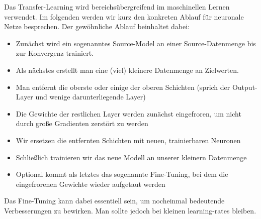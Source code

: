 Das Transfer-Learning wird bereichsübergreifend im maschinellen Lernen verwendet. Im folgenden werden wir kurz den konkreten Ablauf für neuronale Netze besprechen. Der gewöhnliche Ablauf beinhaltet dabei:
\begin{itemize}
	\item Zunächst wird ein sogenanntes Source-Model an einer Source-Datenmenge bis zur Konvergenz trainiert. 
	\item Als nächstes erstellt man eine (viel) kleinere Datenmenge an Zielwerten.
	\item Man entfernt die oberste oder einige der oberen Schichten (sprich der Output-Layer und wenige darunterliegende Layer)
	\item Die Gewichte der restlichen Layer werden zunächst eingefroren, um nicht durch große Gradienten zerstört zu werden
	\item Wir ersetzen die entfernten Schichten mit neuen, trainierbaren Neuronen
	\item Schließlich trainieren wir das neue Modell an unserer kleinern Datenmenge
	\item Optional kommt als letztes das sogenannte Fine-Tuning, bei dem die eingefrorenen Gewichte wieder aufgetaut werden
\end{itemize}
Das Fine-Tuning kann dabei essentiell sein, um nocheinmal bedeutende Verbesserungen zu bewirken. Man sollte jedoch bei kleinen learning-rates bleiben. 


